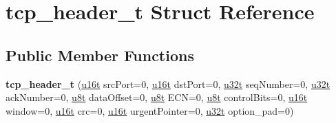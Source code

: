 \hypertarget{structtcp__header__t}{}\section{tcp\+\_\+header\+\_\+t Struct Reference}
\label{structtcp__header__t}
\subsection*{Public Member Functions}
\begin{DoxyCompactItemize}
\item 
\mbox{\label{structtcp__header__t_a8059c930a72b7fa280e74c72425c4a2f}} 
{\bfseries tcp\+\_\+header\+\_\+t} (\hyperlink{macros_8h_a590a9a8f7df8fabfac6573e21da1922d}{u16t} src\+Port=0, \hyperlink{macros_8h_a590a9a8f7df8fabfac6573e21da1922d}{u16t} dst\+Port=0, \hyperlink{macros_8h_a464a07ed2c6d005d677113cc44750a64}{u32t} seq\+Number=0, \hyperlink{macros_8h_a464a07ed2c6d005d677113cc44750a64}{u32t} ack\+Number=0, \hyperlink{macros_8h_a176a4ab0531a048e0693a4520c550193}{u8t} data\+Offset=0, \hyperlink{macros_8h_a176a4ab0531a048e0693a4520c550193}{u8t} E\+CN=0, \hyperlink{macros_8h_a176a4ab0531a048e0693a4520c550193}{u8t} control\+Bits=0, \hyperlink{macros_8h_a590a9a8f7df8fabfac6573e21da1922d}{u16t} window=0, \hyperlink{macros_8h_a590a9a8f7df8fabfac6573e21da1922d}{u16t} crc=0, \hyperlink{macros_8h_a590a9a8f7df8fabfac6573e21da1922d}{u16t} urgent\+Pointer=0, \hyperlink{macros_8h_a464a07ed2c6d005d677113cc44750a64}{u32t} option\+\_\+pad=0)
\end{DoxyCompactItemize}
